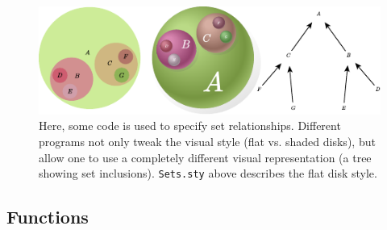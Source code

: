 \begin{figure}[ph]
\begin{minipage}[t]{\columnwidth}
\includegraphics[width=\columnwidth]{assets/penrose/set-styles.pdf}
\end{minipage}
   \caption{Here, some \Substance{} code is used to specify set relationships. Different \Style{} programs not only tweak the visual style (\eg flat vs. shaded disks), but allow one to use a completely different visual representation (\eg a tree showing set inclusions).  \texttt{Sets.sty} above describes the flat disk style.\label{fig:set-styles}}
\end{figure}


\subsection{Functions}
\label{sec:Functions}

